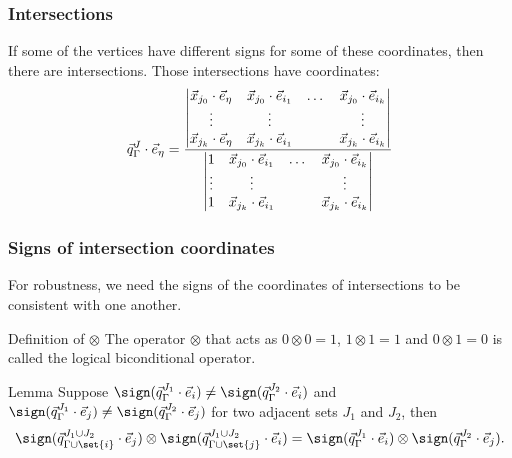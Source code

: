 \documentclass[10pt]{beamer}
\begin{document}
\begin{frame}
\frametitle{Intersections}

If some of the vertices have different signs for some of these coordinates, then there are intersections.
Those intersections have coordinates:
\begin{equation*}
\vec{q}_{\Gamma}^{J} \cdot \vec{e}_{\eta} = \frac{ \begin{vmatrix}
\vec{x}_{j_0} \cdot \vec{e}_{\eta} & \vec{x}_{j_0} \cdot \vec{e}_{i_1} & \dots & \vec{x}_{j_0} \cdot \vec{e}_{i_k} \\
\vdots & \vdots & & \vdots \\
\vec{x}_{j_k} \cdot \vec{e}_{\eta} & \vec{x}_{j_k} \cdot \vec{e}_{i_1} & & \vec{x}_{j_k} \cdot \vec{e}_{i_k} \end{vmatrix} }{ \begin{vmatrix}
1 & \vec{x}_{j_0} \cdot \vec{e}_{i_1} & \dots & \vec{x}_{j_0} \cdot \vec{e}_{i_k} \\
\vdots & \vdots & & \vdots \\
1 & \vec{x}_{j_k} \cdot \vec{e}_{i_1} & & \vec{x}_{j_k} \cdot \vec{e}_{i_k} \end{vmatrix} }
\end{equation*}

\end{frame}

\begin{frame}
\frametitle{Signs of intersection coordinates}

For robustness, we need the signs of the coordinates of intersections to be consistent with one another.

\begin{block}{Definition of $\otimes$}
	The operator $\otimes$ that acts as $0 \otimes 0 = 1$, $1 \otimes 1 = 1$ and $0 \otimes 1 = 0$ is called the logical biconditional operator.
\end{block}

\begin{block}{Lemma}
	Suppose $\signq{J_1}{\Gamma}{i} \neq \signq{J_2}{\Gamma}{i}$ and $\signq{J_1}{\Gamma}{j} \neq \signq{J_2}{\Gamma}{j}$ for two adjacent sets $J_1$ and $J_2$, then
	\begin{equation*}
		\signq{J_1 \cup J_2}{\Gamma \cup \set{i}}{j} \otimes \signq{J_1 \cup J_2}{\Gamma \cup \set{j}}{i} = \signq{J_1}{\Gamma}{i} \otimes \signq{J_2}{\Gamma}{j} .
	\end{equation*}
\end{block}

\end{frame}
\end{document}
